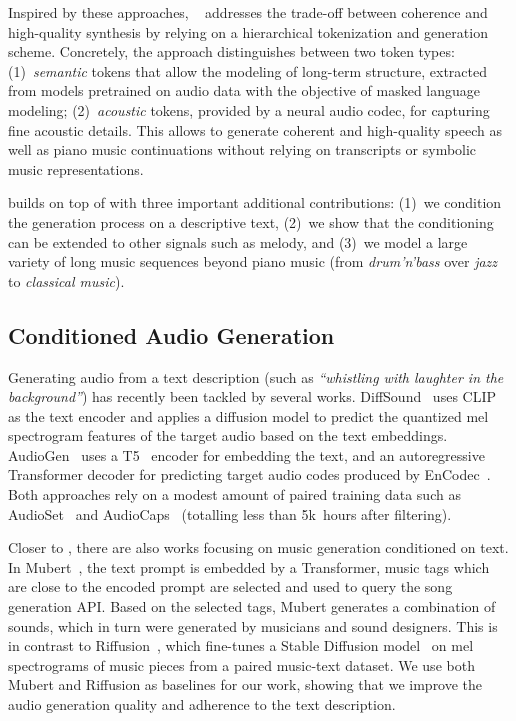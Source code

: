 Inspired by these approaches, \audiolm{}~\cite{audiolm} addresses the trade-off between coherence and high-quality synthesis by relying on a hierarchical tokenization and generation scheme. Concretely, the approach distinguishes between two token types: (1)~\emph{semantic} tokens that allow the modeling of long-term structure, extracted from models pretrained on audio data with the objective of masked language modeling; (2)~\emph{acoustic} tokens, provided by a neural audio codec, for capturing fine acoustic details.
 This allows \audiolm{} to generate coherent and high-quality speech as well as piano music continuations without relying on transcripts or symbolic music representations.

{\model} builds on top of \audiolm{} with three important additional contributions: (1)~we condition the generation process on a descriptive text, (2)~we show that the conditioning can be extended to other signals such as melody, and (3)~we model a large variety of long music sequences beyond piano music (from \textit{drum'n'bass} over \textit{jazz} to \textit{classical music}).

\subsection{Conditioned Audio Generation}
Generating audio from a text description (such as \textit{``whistling with laughter in the background''}) has recently been tackled by several works. DiffSound~\citep{yang2022diffsound} uses CLIP~\citep{clip} as the text encoder and applies a diffusion model to predict the quantized mel spectrogram features of the target audio based on the text embeddings. AudioGen~\citep{audiogen} uses a T5~\citep{t5} encoder for embedding the text, and an autoregressive Transformer decoder for predicting target audio codes produced by EnCodec~\citep{defossez2022highfi}. Both approaches rely on a modest amount of paired training data such as AudioSet~\citep{audioset} and AudioCaps~\citep{audiocaps} (totalling less than 5k~hours after filtering).

 Closer to {\model}, there are also works focusing on music generation conditioned on text. In Mubert~\cite{Mubert}, the text prompt is embedded by a Transformer, music tags which are close to the encoded prompt are selected and used to query the song generation API. Based on the selected tags, Mubert generates a combination of sounds, which in turn were generated by musicians and sound designers. This is in contrast to Riffusion~\cite{riffusion}, which fine-tunes a Stable Diffusion model~\cite{Rombach_2022_CVPR} on mel spectrograms of music pieces from a paired music-text dataset. We use both Mubert and Riffusion as baselines for our work, showing that we improve the audio generation quality and adherence to the text description.

